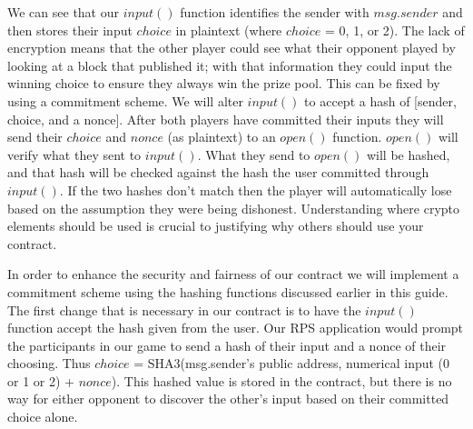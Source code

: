 \documentclass[12pt]{article}
\begin{document}

We can see that our $input()$ function identifies the sender with $msg.sender$ and then stores their input $choice$ in plaintext (where $choice$ = 0, 1, or 2). The lack of encryption means that the other player could see what their opponent played by looking at a block that published it; with that information they could input the winning choice to ensure they always win the prize pool. This can be fixed by using a commitment scheme. We will alter $input()$ to accept a hash of [sender, choice, and a nonce]. After both players have committed their inputs they will send their $choice$ and $nonce$ (as plaintext) to an $open()$ function. $open()$ will verify what they sent to $input()$. What they send to $open()$ will be hashed, and that hash will be checked against the hash the user committed through $input()$. If the two hashes don't match then the player will automatically lose based on the assumption they were being dishonest. Understanding where crypto elements should be used is crucial to justifying why others should use your contract. 

In order to enhance the security and fairness of our contract we will implement a commitment scheme using the hashing functions discussed earlier in this guide. The first change that is necessary in our contract is to have the $input()$ function accept the hash given from the user. Our RPS application would prompt the participants in our game to send a hash of their input and a nonce of their choosing. Thus $choice$ = SHA3(msg.sender's public address, numerical input (0 or 1 or 2) + $nonce$). This hashed value is stored in the contract, but there is no way for either opponent to discover the other's input based on their committed choice alone.\\
\end{document}
